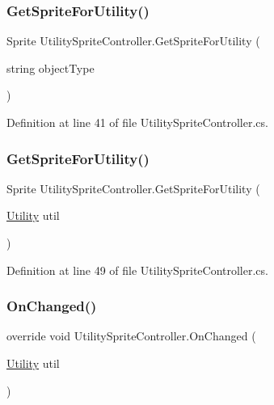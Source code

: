 \subsubsection{\texorpdfstring{Get\+Sprite\+For\+Utility()}{GetSpriteForUtility()}\hspace{0.1cm}{\footnotesize\ttfamily [1/2]}}
{\footnotesize\ttfamily Sprite Utility\+Sprite\+Controller.\+Get\+Sprite\+For\+Utility (\begin{DoxyParamCaption}\item[{string}]{object\+Type }\end{DoxyParamCaption})}



Definition at line 41 of file Utility\+Sprite\+Controller.\+cs.

\mbox{\label{class_utility_sprite_controller_ab38a53fd0f0501ed020e7e404c6edbcd}} 
\subsubsection{\texorpdfstring{Get\+Sprite\+For\+Utility()}{GetSpriteForUtility()}\hspace{0.1cm}{\footnotesize\ttfamily [2/2]}}
{\footnotesize\ttfamily Sprite Utility\+Sprite\+Controller.\+Get\+Sprite\+For\+Utility (\begin{DoxyParamCaption}\item[{\hyperlink{class_utility}{Utility}}]{util }\end{DoxyParamCaption})}



Definition at line 49 of file Utility\+Sprite\+Controller.\+cs.

\mbox{\label{class_utility_sprite_controller_ad295ddcf30b5ce02b3d09fddca92b681}} 
\subsubsection{\texorpdfstring{On\+Changed()}{OnChanged()}}
{\footnotesize\ttfamily override void Utility\+Sprite\+Controller.\+On\+Changed (\begin{DoxyParamCaption}\item[{\hyperlink{class_utility}{Utility}}]{util }\end{DoxyParamCaption})\hspace{0.3cm}{\ttfamily [protected]}}



